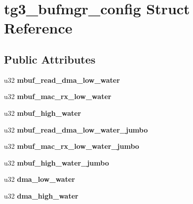 \hypertarget{structtg3__bufmgr__config}{
\section{tg3\_\-bufmgr\_\-config Struct Reference}
\label{structtg3__bufmgr__config}
}
\subsection*{Public Attributes}
\begin{DoxyCompactItemize}
\item 
\hypertarget{structtg3__bufmgr__config_af4e028901d1ed88c64a5111d723dbb74}{
u32 {\bfseries mbuf\_\-read\_\-dma\_\-low\_\-water}}
\label{structtg3__bufmgr__config_af4e028901d1ed88c64a5111d723dbb74}

\item 
\hypertarget{structtg3__bufmgr__config_afff072cb7ad06e29a2887697e6a1db3d}{
u32 {\bfseries mbuf\_\-mac\_\-rx\_\-low\_\-water}}
\label{structtg3__bufmgr__config_afff072cb7ad06e29a2887697e6a1db3d}

\item 
\hypertarget{structtg3__bufmgr__config_ace27b56598723bae23b648876cb14de4}{
u32 {\bfseries mbuf\_\-high\_\-water}}
\label{structtg3__bufmgr__config_ace27b56598723bae23b648876cb14de4}

\item 
\hypertarget{structtg3__bufmgr__config_a9d88a8f6ef777fbc3dcac109819ee9ef}{
u32 {\bfseries mbuf\_\-read\_\-dma\_\-low\_\-water\_\-jumbo}}
\label{structtg3__bufmgr__config_a9d88a8f6ef777fbc3dcac109819ee9ef}

\item 
\hypertarget{structtg3__bufmgr__config_ad5e7d0ea043cfee97a97346b0cc90cc0}{
u32 {\bfseries mbuf\_\-mac\_\-rx\_\-low\_\-water\_\-jumbo}}
\label{structtg3__bufmgr__config_ad5e7d0ea043cfee97a97346b0cc90cc0}

\item 
\hypertarget{structtg3__bufmgr__config_a6600bfcc8168265405f6daa6ba981548}{
u32 {\bfseries mbuf\_\-high\_\-water\_\-jumbo}}
\label{structtg3__bufmgr__config_a6600bfcc8168265405f6daa6ba981548}

\item 
\hypertarget{structtg3__bufmgr__config_a58bfd1f422d2306f49bb2d92560ada75}{
u32 {\bfseries dma\_\-low\_\-water}}
\label{structtg3__bufmgr__config_a58bfd1f422d2306f49bb2d92560ada75}

\item 
\hypertarget{structtg3__bufmgr__config_a23c34feea2b92b3cd319b8d1adc824a7}{
u32 {\bfseries dma\_\-high\_\-water}}
\label{structtg3__bufmgr__config_a23c34feea2b92b3cd319b8d1adc824a7}

\end{DoxyCompactItemize}


